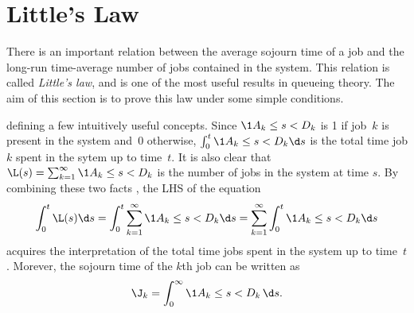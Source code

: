 



\section{Little's Law}
\label{sec:littles-law}

There is an important relation between the average sojourn time of a job and the long-run time-average number of jobs contained in the system.
This relation is called \emph{Little's law}, and is one of the most useful results in queueing theory.
The aim of this section is to prove this law under some simple conditions.


 defining a few intuitively useful concepts.
Since $\1{A_{k}\leq s < D_{k}}$ is 1 if job~$k$ is present in the system and~0 otherwise, $\int_{0}^{t} \1{A_{k}\leq s < D_{k}} \d s$ is the total time job $k$ spent in the sytem up to time~$t$.
It is also clear that $\L(s) = \sum_{k=1}^\infty \1{A_k \leq s < D_k}$ is the number of jobs in the system at time $s$.
By combining these two facts , the LHS of the equation
\begin{equation}\label{eq:little:2}
\int_{0}^{t}\L(s) \d s = \int_{0}^{t }\sum_{k=1}^\infty \1{A_k \leq s < D_k} \d s = \sum_{k=1}^\infty \int_{0}^{t }\1{A_k \leq s < D_k} \d s
\end{equation}
acquires the interpretation of the total time jobs spent in the system up to time~$t$.
Morever, the sojourn time of the $k$th job can be written as
\begin{equation*}
 \J_k = \int_0^\infty \1{A_k \leq s < D_k}\,\d s.
\end{equation*}



